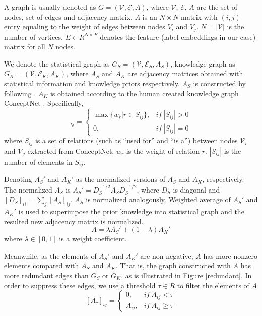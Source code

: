 \documentclass[letterpaper]{article} \usepackage{aaai20}  \usepackage{times}  \usepackage{helvet} \usepackage{courier}  \usepackage[hyphens]{url}  \usepackage{graphicx} \usepackage{subfigure}
\begin{document}
A graph is usually denoted as $G = (\mathcal{V}, \mathcal{E}, A)$, where $\mathcal{V}$, $\mathcal{E}$, $A$ are the set of nodes, set of edges and adjacency matrix. $A$ is an $N \times N$ matrix with $(i,j)$ entry equaling to the weight of edges between nodes $V_i$ and $V_j$. $N=|\mathcal{V}|$ is the number of vertices. $E\in R^{N \times F}$ denotes the feature  (label embeddings in our case) matrix for all $N$ nodes.





We denote the statistical graph as $G_S = (\mathcal{V}, \mathcal{E}_S, A_S)$, knowledge graph as $G_K = (\mathcal{V}, \mathcal{E}_K, A_K)$, where $A_S$ and $A_K$ are adjacency matrices obtained with statistical information and knowledge priors respectively. $A_S$ is constructed by following \cite{chen2019multi}. $A_K$ is obtained according to the human created knowledge graph ConceptNet \cite{speer2017conceptnet}. Specifically,
\begin{equation}
[A_K]_{ij} = \begin{cases}
\max \{w_r| r \in S_{ij}\}, &  if \ |S_{ij}| > 0\\
0, & if\ |S_{ij}| = 0
\end{cases}
\end{equation}
where $S_{ij}$ is a set of relations (such as ``used for'' and ``is a'') between nodes $\mathcal{V}_i$ and $\mathcal{V}_j$ extracted from ConceptNet. $w_r$ is the weight of relation $r$. $|S_{ij}|$ is the number of elements in $S_{ij}$.



    Denoting $A_S'$ and $A_K'$ as the normalized versions of $A_S$ and $A_K$, respectively. The normalized $A_S$ is $A_S' = D_S^{-1/2} A_S D_S^{-1/2}$, where $D_S$ is diagonal and $[D_S]_{ii} = \sum_j [A_S]_{ij}$. $A_S$ is normalized analogously. Weighted average of $A_S'$ and $A_K'$ is used to superimpose the prior knowledge into statistical graph and the resulted new adjacency matrix is normalized. \begin{equation} \label{merge}
	A = \lambda A_S' + (1 - \lambda) A_K'
\end{equation}
where $\lambda \in [0, 1]$ is a weight coefficient.

Meanwhile, as the elements of $A_S'$ and $A_K'$ are non-negative, $A$ has more nonzero elements compared with $A_S$ and $A_K$. That is, the graph constructed with $A$ has more redundant edges than $G_S$ or $G_K$, as is illustrated in Figure \ref{redundant}. In order to suppress these edges, we use a threshold $\tau \in R$ to filter the elements of $A$
\begin{equation} \label{tau}
	[A_{\tau}]_{ij} = 
	\begin{cases}
		0, &if \ A_{ij} < \tau \\
		A_{ij}, &if \ A_{ij} \geq \tau
	\end{cases}
\end{equation}
\end{document}
